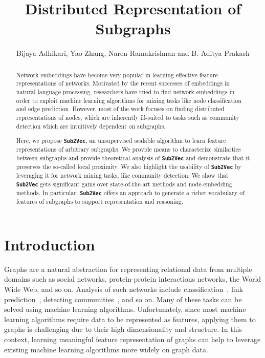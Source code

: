 \documentclass[sigconf]{acmart}
\newcommand{\alg}{{\bf {\tt Sub2Vec}}\xspace}
\begin{document}
\title{Distributed Representation of Subgraphs}
\author{Bijaya Adhikari, Yao Zhang, Naren Ramakrishnan and B. Aditya Prakash}

\renewcommand{\shortauthors}{B. Adhikari et al.}
\begin{abstract}
Network embeddings have become very popular in learning
effective feature representations of networks. Motivated by the recent successes of 
embeddings in natural language processing, researchers have tried to find network embeddings in order to exploit machine learning algorithms for mining tasks like node classification and edge prediction. However, most of the work focuses on finding distributed representations of nodes, which
are inherently ill-suited to tasks such as community detection which are intuitively dependent on subgraphs. 

Here, we propose \alg, an unsupervised scalable algorithm to learn feature representations of arbitrary subgraphs. We provide means to characterize similarties between subgraphs and  provide theoretical analysis of \alg and demonstrate that it preserves the so-called local proximity. We also highlight the usability of \alg by leveraging it for network mining tasks, like community detection. We show that \alg gets significant gains over state-of-the-art methods and node-embedding methods. In particular, \alg offers an approach to generate a richer vocabulary of features of subgraphs to support representation and reasoning.

\end{abstract}


\date{}
\maketitle


\section{Introduction}
\label{sec:intro}


Graphs are a natural abstraction for representing relational data from multiple domains such as social networks,  protein-protein interactions networks, the World Wide Web, and so on. Analysis of such networks include classification~\cite{bhagat2011node}, link prediction~\cite{liben2007link}, detecting communities~\cite{girvan2002community, blondel2008fast}, and so on. Many of these tasks can be solved using machine learning algorithms. Unfortunately, since most machine learning algorithms require data to be represented as features, applying them to graphs is challenging due to their high dimensionality and structure. In this context, learning meaningful feature representation of graphs can help to leverage existing machine learning algorithms more widely on graph data.
\end{document}
